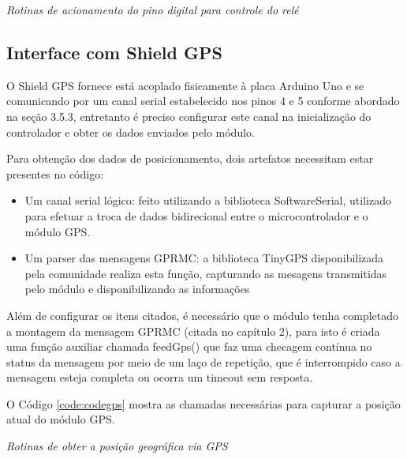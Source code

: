 \renewcommand{\baselinestretch}{0.5}  %
\begin{codigo}[htb]
\fontsize{9pt}{9pt}\selectfont
      \begin{boxit}  %
      \vspace{2mm}
   \end{boxit}
   \caption{\it Rotinas de acionamento do pino digital para controle do relé}
   \label{code:ctrlrelay}
\end{codigo}
  

\subsection{Interface com Shield GPS}

O Shield GPS fornece está acoplado fisicamente à placa Arduino Uno e se comunicando por um canal serial estabelecido nos pinos 4 e 5 conforme abordado na seção 3.5.3, entretanto é preciso configurar este canal na inicialização do controlador e obter os dados enviados pelo módulo.

Para obtenção dos dados de posicionamento, dois artefatos necessitam estar presentes no código: 

\begin{itemize}
	\item Um canal serial lógico: feito utilizando a biblioteca SoftwareSerial, utilizado para efetuar a troca de dados bidirecional entre o microcontrolador e o módulo GPS.
	\item Um parser das mensagens GPRMC: a biblioteca TinyGPS disponibilizada pela comunidade realiza esta função, capturando as mesagens transmitidas pelo módulo e disponibilizando as informações 
\end{itemize}

Além de configurar os itens citados, é necessário que o módulo tenha completado a montagem da mensagem GPRMC (citada no capítulo 2), para isto é criada uma função auxiliar chamada feedGps() que faz uma checagem contínua no status da mensagem por meio de um laço de repetição, que é interrompido caso a mensagem esteja completa ou ocorra um timeout sem resposta.

O Código \ref{code:codegps} mostra as chamadas necessárias para capturar a posição atual do módulo GPS.

\renewcommand{\baselinestretch}{0.5}  %
\begin{codigo}[htb]
\fontsize{9pt}{9pt}\selectfont
      \begin{boxit}  %
      \vspace{2mm}
   \end{boxit}
   \caption{\it Rotinas de obter a posição geográfica via GPS}
   \label{code:codegps}
\end{codigo}

